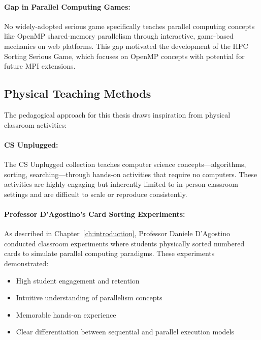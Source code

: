 \paragraph*{Gap in Parallel Computing Games:}

No widely-adopted serious game specifically teaches parallel computing concepts like OpenMP shared-memory parallelism through interactive, game-based mechanics on web platforms. This gap motivated the development of the HPC Sorting Serious Game, which focuses on OpenMP concepts with potential for future MPI extensions.

\subsection{Physical Teaching Methods}
\label{subsec:physical-methods}

The pedagogical approach for this thesis draws inspiration from physical classroom activities:

\paragraph*{CS Unplugged:}

The CS Unplugged \citep{cs_unplugged} collection teaches computer science concepts---algorithms, sorting, searching---through hands-on activities that require no computers. These activities are highly engaging but inherently limited to in-person classroom settings and are difficult to scale or reproduce consistently.

\paragraph*{Professor D'Agostino's Card Sorting Experiments:}

As described in Chapter~\ref{ch:introduction}, Professor Daniele D'Agostino conducted classroom experiments where students physically sorted numbered cards to simulate parallel computing paradigms. These experiments demonstrated:

\begin{itemize}
    \item High student engagement and retention
    \item Intuitive understanding of parallelism concepts
    \item Memorable hands-on experience
    \item Clear differentiation between sequential and parallel execution models
\end{itemize}

